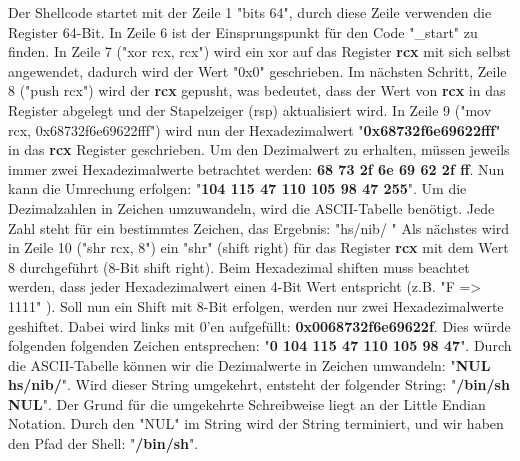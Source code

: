 \documentclass[12pt]{article}
\begin{document}
Der Shellcode startet mit der Zeile 1 "bits 64", durch diese Zeile verwenden die Register 64-Bit. In Zeile 6 ist der Einsprungspunkt für den Code "\_start" zu finden. \newline
In Zeile 7 ("xor rcx, rcx") wird ein xor auf das Register \textbf{rcx} mit sich selbst angewendet, dadurch wird der Wert "0x0" geschrieben. Im nächsten Schritt,  Zeile 8 ("push rcx") wird der \textbf{rcx} gepusht, was bedeutet, dass der Wert von \textbf{rcx} in das Register abgelegt und der Stapelzeiger (rsp) aktualisiert wird.\newline
In Zeile 9 ("mov rcx, 0x68732f6e69622fff") wird nun der Hexadezimalwert \newline 
"\textbf{0x68732f6e69622fff}" in das \textbf{rcx} Register geschrieben. Um den Dezimalwert zu erhalten, müssen jeweils immer zwei Hexadezimalwerte betrachtet werden: \textbf{68 73 2f 6e 69 62 2f ff}. Nun kann die Umrechung erfolgen: \newline
"\textbf{104 115 47 110 105 98 47 255}". \newline
Um die Dezimalzahlen in Zeichen umzuwandeln, wird die ASCII-Tabelle benötigt. Jede Zahl steht für ein bestimmtes Zeichen, das Ergebnis: \newline
"hs/nib/ "\newline
Als nächstes wird in Zeile 10 ("shr rcx, 8") ein "shr" (shift right) für das Register \textbf{rcx} mit dem Wert 8 durchgeführt (8-Bit shift right). Beim Hexadezimal shiften muss beachtet werden, dass jeder Hexadezimalwert einen 4-Bit Wert entspricht (z.B. "F => 1111" ). Soll nun ein Shift mit 8-Bit erfolgen, werden nur zwei Hexadezimalwerte geshiftet. Dabei wird links mit 0'en aufgefüllt: \newline
\textbf{0x0068732f6e69622f}.\newline
Dies würde folgenden folgenden Zeichen entsprechen: \newline 
"\textbf{0 104 115 47 110 105 98 47}". \newline
Durch die ASCII-Tabelle können wir die Dezimalwerte in Zeichen umwandeln: \newline
"\textbf{NUL hs/nib/}". \newline
\newline
Wird dieser String umgekehrt, entsteht der folgender String: "\textbf{/bin/sh NUL}".
\newline
Der Grund für die umgekehrte Schreibweise liegt an der Little Endian Notation. Durch den "NUL" im String wird der String terminiert, und wir haben den Pfad der Shell: "\textbf{/bin/sh}". \newline
\end{document}
